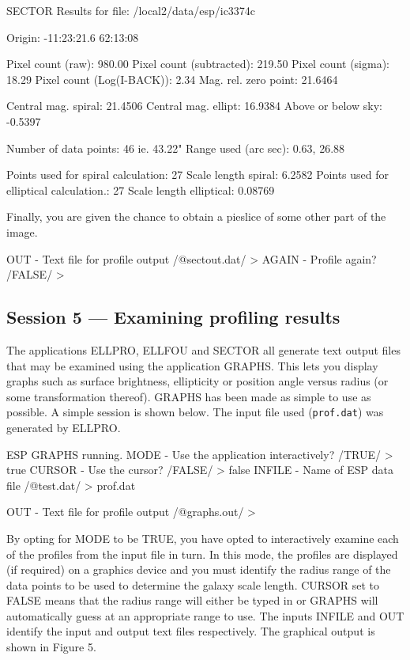 \documentclass[twoside,11pt]{starlink}
\begin{document}
\begin{terminalv}
SECTOR Results for file: /local2/data/esp/ic3374c

Origin:  -11:23:21.6  62:13:08

Pixel count (raw):              980.00
Pixel count (subtracted):       219.50
Pixel count (sigma):             18.29
Pixel count (Log(I-BACK)):        2.34
Mag. rel. zero point:          21.6464

Central mag. spiral:  21.4506
Central mag. ellipt:  16.9384
Above or below sky:   -0.5397

Number of data points:      46 ie.  43.22"
Range used (arc sec):     0.63,  26.88

Points used for spiral calculation:        27
Scale length spiral:                   6.2582
Points used for elliptical calculation.:   27
Scale length elliptical:              0.08769
\end{terminalv}

Finally, you are given the chance to obtain a pieslice of some other
part of the image.

\begin{terminalv}
OUT - Text file for profile output /@sectout.dat/ >
AGAIN - Profile again? /FALSE/ >
\end{terminalv}


\subsection{Session 5 --- Examining profiling results}

The applications ELLPRO, ELLFOU and SECTOR all generate text output
files that may be examined using the application GRAPHS. This lets
you display graphs such as surface brightness, ellipticity or position
angle versus radius (or some transformation thereof). GRAPHS
has been made as simple to use as possible. A simple session is shown below.
The input file used (\texttt{prof.dat}) was generated by ELLPRO.

\begin{terminalv}

ESP GRAPHS running.
MODE - Use the application interactively? /TRUE/ > true
CURSOR - Use the cursor? /FALSE/ > false
INFILE - Name of ESP data file /@test.dat/ > prof.dat

OUT - Text file for profile output /@graphs.out/ >
\end{terminalv}

By opting for MODE to be TRUE, you have opted to interactively examine
each of the profiles from the input file in turn. In this mode, the profiles are
displayed (if required) on a graphics device and you must
identify the radius range of the data points to be used to determine the
galaxy scale length. CURSOR set to FALSE means that the radius range will
either be typed in or GRAPHS will automatically guess at an
appropriate range to use. The inputs INFILE and OUT identify the input and
output text files respectively. The graphical output is shown in
Figure 5.
\end{document}
